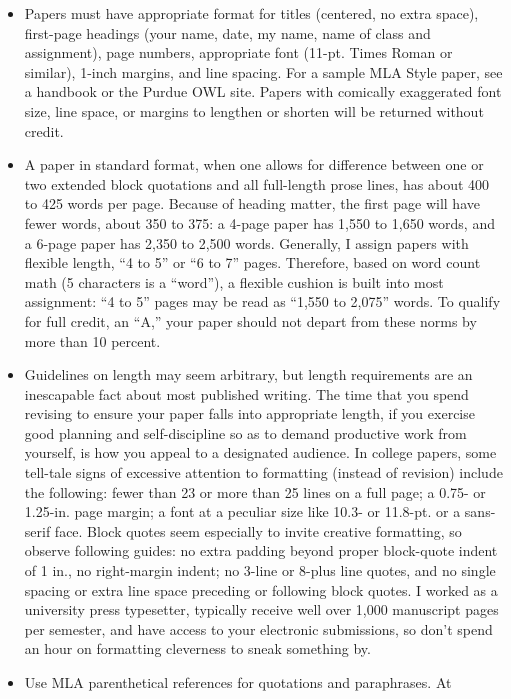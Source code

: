 \documentclass[]{article}
\begin{document}
\begin{itemize}
\item
  Papers must have appropriate format for titles (centered, no extra
  space), first-page headings (your name, date, my name, name of class
  and assignment), page numbers, appropriate font (11-pt. Times Roman or
  similar), 1-inch margins, and line spacing. For a sample MLA Style
  paper, see a handbook or the Purdue OWL site. Papers with comically
  exaggerated font size, line space, or margins to lengthen or shorten
  will be returned without credit.
\item
  A paper in standard format, when one allows for difference between one
  or two extended block quotations and all full-length prose lines, has
  about 400 to 425 words per page. Because of heading matter, the first
  page will have fewer words, about 350 to 375: a 4-page paper has 1,550
  to 1,650 words, and a 6-page paper has 2,350 to 2,500 words.
  Generally, I assign papers with flexible length, ``4 to 5'' or ``6 to
  7'' pages. Therefore, based on word count math (5 characters is a
  ``word''), a flexible cushion is built into most assignment: ``4 to
  5'' pages may be read as ``1,550 to 2,075'' words. To qualify for full
  credit, an ``A,'' your paper should not depart from these norms by
  more than 10 percent.
\item
  Guidelines on length may seem arbitrary, but length requirements are
  an inescapable fact about most published writing. The time that you
  spend revising to ensure your paper falls into appropriate length, if
  you exercise good planning and self-discipline so as to demand
  productive work from yourself, is how you appeal to a designated
  audience. In college papers, some tell-tale signs of excessive
  attention to formatting (instead of revision) include the following:
  fewer than 23 or more than 25 lines on a full page; a 0.75- or
  1.25-in. page margin; a font at a peculiar size like 10.3- or 11.8-pt.
  or a sans-serif face. Block quotes seem especially to invite creative
  formatting, so observe following guides: no extra padding beyond
  proper block-quote indent of 1 in., no right-margin indent; no 3-line
  or 8-plus line quotes, and no single spacing or extra line space
  preceding or following block quotes. I worked as a university press
  typesetter, typically receive well over 1,000 manuscript pages per
  semester, and have access to your electronic submissions, so don't
  spend an hour on formatting cleverness to sneak something by.
\item
  Use MLA parenthetical references for quotations and paraphrases. At

\end{itemize}
\end{document}
